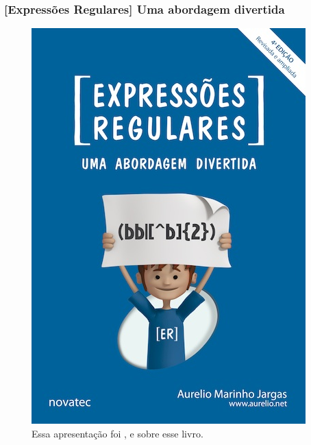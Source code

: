 \begin{frame}
\frametitle{[Expressões Regulares] Uma abordagem divertida}

\begin{figure}[h]
\centering
\includegraphics[height=0.75\textheight]{./imagens/re/piazinho.jpg}
\caption{Essa apresentação foi ,  e  sobre esse livro.}
\end{figure}
\end{frame}

